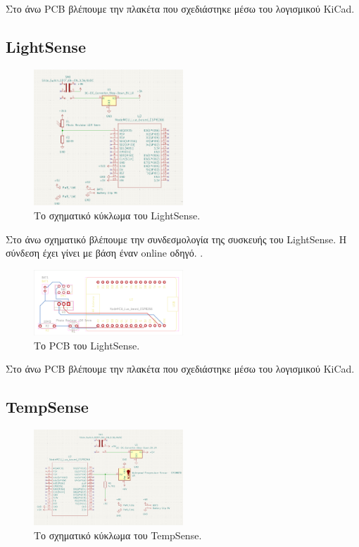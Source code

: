 \documentclass[conference]{IEEEtran}
\begin{document}
Στο άνω PCB βλέπουμε την πλακέτα που σχεδιάστηκε μέσω του λογισμικού KiCad.

\subsection{LightSense}

\begin{figure}[H]
	\centerline{\includegraphics[width=0.5\textwidth]{assets/lightsense-schematic}}
	\caption{Το σχηματικό κύκλωμα του LightSense.}
	\label{Το σχηματικό κύκλωμα του LightSense.}
\end{figure}

Στο άνω σχηματικό βλέπουμε την συνδεσμολογία της συσκευής του LightSense. Η σύνδεση έχει γίνει με βάση έναν online οδηγό. \cite{ldrconnect}.

\begin{figure}[H]
	\colorbox{PineGreen}{\centerline{\includegraphics[width=0.5\textwidth]{assets/LightSense-brd}}}
	\caption{Το PCB του LightSense.}
	\label{Το PCB του LightSense.}
\end{figure}

Στο άνω PCB βλέπουμε την πλακέτα που σχεδιάστηκε μέσω του λογισμικού KiCad.

\subsection{TempSense}

\begin{figure}[H]
	\centerline{\includegraphics[width=0.5\textwidth]{assets/tempsense-schematic}}
	\caption{Το σχηματικό κύκλωμα του TempSense.}
	\label{Το σχηματικό κύκλωμα του TempSense.}
\end{figure}
\end{document}

